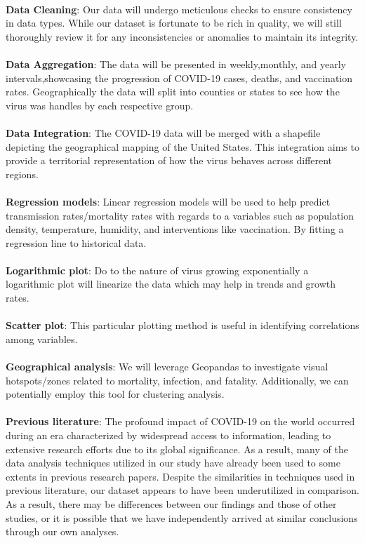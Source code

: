 \documentclass[sigconf,screen,nonacm]{acmart}
\begin{document}
\\
\textbf{Data Cleaning}: Our data will undergo meticulous checks to ensure consistency in data types. While our dataset is fortunate to be rich in quality, we will still thoroughly review it for any inconsistencies or anomalies to maintain its integrity. \\
\\
\textbf{Data Aggregation}: The data will be presented in weekly,monthly, and yearly intervals,showcasing the progression of COVID-19 cases, deaths, and vaccination rates. Geographically the data will split into counties or states to see how the virus was handles by each respective group.\\ 
\\
\textbf{Data Integration}: The COVID-19 data will be merged with a shapefile depicting the geographical mapping of the United States. This integration aims to provide a territorial representation of how the virus behaves across different regions. \\
\\
\textbf{Regression models}: Linear regression models will be used to help predict transmission rates/mortality rates with regards to a variables such as population density, temperature, humidity, and interventions like vaccination. By fitting a regression line to historical data. \\
\\
\textbf{Logarithmic plot}: Do to the nature of virus growing exponentially a logarithmic plot will linearize the data which may help in trends and growth rates. \\
\\
\textbf{Scatter plot}: This particular plotting method is useful in identifying correlations among variables. \\
\\
\textbf{Geographical analysis}: We will leverage Geopandas to investigate visual hotspots/zones related to mortality, infection, and fatality. Additionally, we can potentially employ this tool for clustering analysis. \\ 
\\
\textbf{Previous literature}: The profound impact of COVID-19 on the world occurred during an era characterized by widespread access to information, leading to extensive research efforts due to its global significance. As a result, many of the data analysis techniques utilized in our study have already been used to some extents in previous research papers. Despite the similarities in techniques used in previous literature, our dataset appears to have been underutilized in comparison. As a result, there may be differences between our findings and those of other studies, or it is possible that we have independently arrived at similar conclusions through our own analyses.
\end{document}
